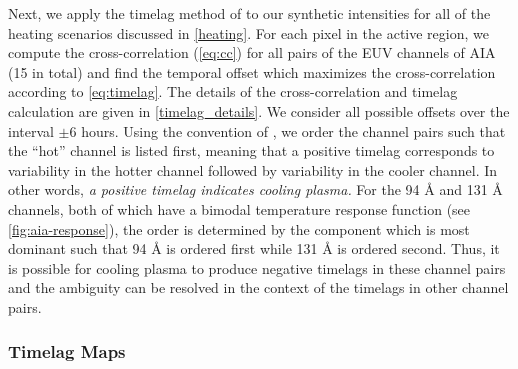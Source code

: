 Next, we apply the timelag method of \citet{viall_evidence_2012} to our synthetic intensities for all of the heating scenarios discussed in \autoref{heating}. For each pixel in the active region, we compute the cross-correlation (\autoref{eq:cc}) for all pairs of the EUV channels of AIA (15 in total) and find the temporal offset which maximizes the cross-correlation according to \autoref{eq:timelag}. The details of the cross-correlation and timelag calculation are given in \autoref{timelag_details}. We consider all possible offsets over the interval $\pm6$ hours. Using the convention of \citet{viall_evidence_2012}, we order the channel pairs such that the ``hot'' channel is listed first, meaning that a positive timelag corresponds to variability in the hotter channel followed by variability in the cooler channel. In other words, \textit{a positive timelag indicates cooling plasma.} For the 94 \AA{} and 131 \AA{} channels, both of which have a bimodal temperature response function (see \autoref{fig:aia-response}), the order is determined by the component which is most dominant such that 94 \AA{} is ordered first while 131 \AA{} is ordered second. Thus, it is possible for cooling plasma to produce negative timelags in these channel pairs and the ambiguity can be resolved in the context of the timelags in other channel pairs.

\subsubsection{Timelag Maps}\label{timelag_maps}

